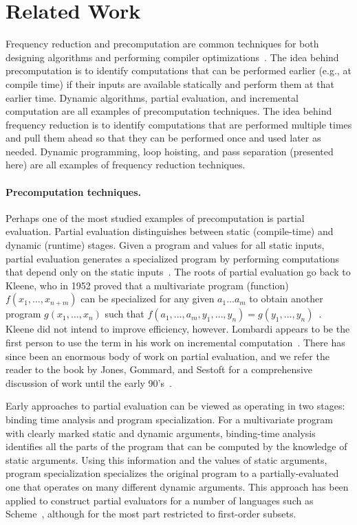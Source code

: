 
\section{Related Work}
\label{sec:related}

Frequency reduction and precomputation are common techniques for both
designing algorithms and performing compiler
optimizations~\cite{JS86-staging}.
%
The idea behind precomputation is to identify computations that can be
performed earlier (e.g., at compile time) if their inputs are
available statically and perform them at that earlier time. Dynamic
algorithms, partial evaluation, and incremental computation are all
examples of precomputation techniques.
%
The idea behind frequency
reduction is to identify computations that are performed multiple
times and pull them ahead so that they can be performed once and used
later as needed.  Dynamic programming, loop hoisting, and pass
separation (presented here) are all examples of frequency reduction
techniques.

\paragraph{Precomputation techniques.}
Perhaps one of the most studied examples of precomputation is
partial evaluation.  Partial evaluation distinguishes between static
(compile-time) and dynamic (runtime) stages. Given a program and values 
for all static inputs, partial evaluation generates a specialized program by
performing computations that depend only on the static
inputs~\cite{jones96}.  The roots of partial evaluation go back to
Kleene, who in 1952 proved that a multivariate program (function)
$f(x_1, \ldots, x_{n+m})$ can be specialized for any given $a_1 \ldots
a_m$ to obtain another program $g(x_1, \ldots, x_n)$ such that $f(a_1,
\ldots, a_m, y_1, \ldots, y_n) = g(y_1, \ldots, y_n)$~\cite{Kleene52}.
Kleene did not intend to improve efficiency, however.  Lombardi
appears to be the first person to use the term in his work on
incremental computation~\cite{Lombardi67}.  There has since been 
an enormous body of work on partial evaluation, and we refer the reader to the
book by Jones, Gommard, and Sestoft for a comprehensive discussion of
work until the early 90's~\cite{JGS93}.

Early approaches to partial evaluation can be viewed as operating in
two stages: binding time analysis and program specialization.  For a
multivariate program with clearly marked static and dynamic arguments,
binding-time analysis identifies all the parts of the program that can
be computed by the knowledge of static arguments. Using this
information and the values of static arguments, program
specialization specializes the original program to a partially-evaluated
one that operates on many different dynamic arguments.  This
approach has been applied to construct partial evaluators for a number
of languages such as Scheme~\cite{OB91-Similix,Consel88-Schism}, 
although for the most part restricted to first-order subsets.

